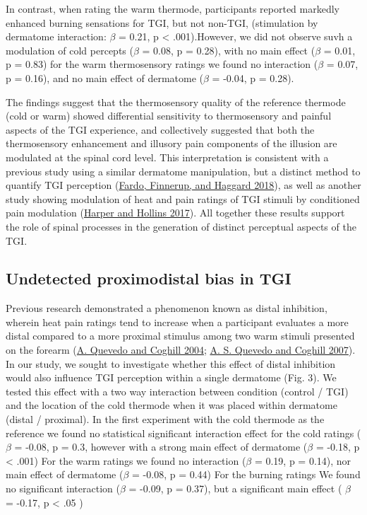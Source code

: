 \documentclass[
]{article}
\begin{document}
In contrast, when rating the warm thermode, participants reported
markedly enhanced burning sensations for TGI, but not non-TGI,
(stimulation by dermatome interaction: \(\beta\) = 0.21, p \textless{}
.001).However, we did not observe suvh a modulation of cold percepts
(\(\beta\) = 0.08, p = 0.28), with no main effect (\(\beta\) = 0.01, p =
0.83) for the warm thermosensory ratings we found no interaction
(\(\beta\) = 0.07, p = 0.16), and no main effect of dermatome (\(\beta\)
= -0.04, p = 0.28).

The findings suggest that the thermosensory quality of the reference
thermode (cold or warm) showed differential sensitivity to thermosensory
and painful aspects of the TGI experience, and collectively suggested
that both the thermosensory enhancement and illusory pain components of
the illusion are modulated at the spinal cord level. This interpretation
is consistent with a previous study using a similar dermatome
manipulation, but a distinct method to quantify TGI perception
(\protect\hyperlink{ref-fardo_organization_2018}{Fardo, Finnerup, and
Haggard 2018}), as well as another study showing modulation of heat and
pain ratings of TGI stimuli by conditioned pain modulation
(\protect\hyperlink{ref-harper_conditioned_2017}{Harper and Hollins
2017}). All together these results support the role of spinal processes
in the generation of distinct perceptual aspects of the TGI.

\hypertarget{undetected-proximodistal-bias-in-tgi}{%
\subsection{Undetected proximodistal bias in
TGI}\label{undetected-proximodistal-bias-in-tgi}}

Previous research demonstrated a phenomenon known as distal inhibition,
wherein heat pain ratings tend to increase when a participant evaluates
a more distal compared to a more proximal stimulus among two warm
stimuli presented on the forearm
(\protect\hyperlink{ref-quevedo_psychophysicshyperalgesia_2004}{A.
Quevedo and Coghill 2004};
\protect\hyperlink{ref-quevedo_illusion_2007}{A. S. Quevedo and Coghill
2007}). In our study, we sought to investigate whether this effect of
distal inhibition would also influence TGI perception within a single
dermatome (Fig. 3). We tested this effect with a two way interaction
between condition (control / TGI) and the location of the cold thermode
when it was placed within dermatome (distal / proximal). In the first
experiment with the cold thermode as the reference we found no
statistical significant interaction effect for the cold ratings
(\(\beta\) = -0.08, p = 0.3, however with a strong main effect of
dermatome (\(\beta\) = -0.18, p \textless{} .001) For the warm ratings
we found no interaction (\(\beta\) = 0.19, p = 0.14), nor main effect of
dermatome (\(\beta\) = -0.08, p = 0.44) For the burning ratings We found
no significant interaction (\(\beta\) = -0.09, p = 0.37), but a
significant main effect ( \(\beta\) = -0.17, p \textless{} .05 )
\end{document}
